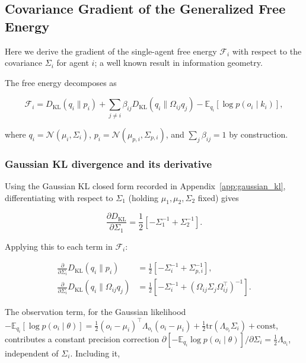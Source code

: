 \documentclass[11pt]{article}
\begin{document}
\subsection{Covariance Gradient of the Generalized Free Energy}

Here we derive the gradient of the single-agent free energy $\mathcal{F}_i$ with respect to the covariance $\Sigma_i$ for agent $i$; a well known result in information geometry.

The free energy decomposes as

\begin{equation}
\mathcal{F}_i
=D_{\mathrm{KL}}(q_i \| p_i)
+ \sum_{j \neq i} \beta_{ij}
D_{\mathrm{KL}}(q_i \| \Omega_{ij} q_j)
- \mathbb{E}_{q_i}[\log p(o_i \mid k_i)],
\end{equation}

where $q_i = \mathcal{N}(\mu_i, \Sigma_i)$, $p_i = \mathcal{N}(\mu_{p,i}, \Sigma_{p,i})$, and $\sum_j \beta_{ij} = 1$ by construction.

\subsubsection{Gaussian KL divergence and its derivative}

Using the Gaussian KL closed form recorded in Appendix~\ref{app:gaussian_kl}, differentiating with respect to $\Sigma_1$ (holding $\mu_1, \mu_2, \Sigma_2$ fixed) gives

\begin{equation}
\frac{\partial D_{\mathrm{KL}}}{\partial \Sigma_1}
=\frac{1}{2}\left[
-\Sigma_1^{-1}
+ \Sigma_2^{-1}
\right].
\end{equation}

Applying this to each term in $\mathcal{F}_i$:

\begin{align}
\frac{\partial}{\partial \Sigma_i}
D_{\mathrm{KL}}(q_i \| p_i)
&=\frac{1}{2}\left[
-\Sigma_i^{-1}
+ \Sigma_{p,i}^{-1}
\right],
\\[6pt]
\frac{\partial}{\partial \Sigma_i}
D_{\mathrm{KL}}(q_i \| \Omega_{ij} q_j)
&=
\frac{1}{2}\left[
-\Sigma_i^{-1}
+ (\Omega_{ij}\Sigma_j\Omega_{ij}^\top)^{-1}
\right].
\end{align}

The observation term, for the Gaussian likelihood $-\mathbb{E}_{q_i}[\log p(o_i \mid \theta)] = \tfrac{1}{2}(o_i - \mu_i)^\top \Lambda_{o_i}(o_i - \mu_i) + \tfrac{1}{2}\mathrm{tr}(\Lambda_{o_i}\Sigma_i) + \mathrm{const}$, contributes a constant precision correction $\partial[-\mathbb{E}_{q_i}\log p(o_i \mid \theta)]/\partial\Sigma_i = \tfrac{1}{2}\Lambda_{o_i}$, independent of $\Sigma_i$. Including it,
\end{document}
